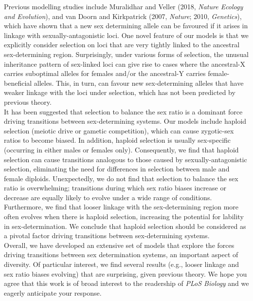 \documentclass[12pt,letterpaper]{article}
\begin{document}
Previous modelling studies include Muralidhar and Veller (2018, \textit{Nature Ecology and Evolution}), and van Doorn and Kirkpatrick (2007, \textit{Nature}; 2010, \textit{Genetics}), which have shown that a new sex determining allele can be favoured if it arises in linkage with sexually-antagonistic loci. 
One novel feature of our models is that we explicitly consider selection on loci that are very tightly linked to the ancestral sex-determining region.
Surprisingly, under various forms of selection, the unusual inheritance pattern of sex-linked loci can give rise to cases where the ancestral-X carries suboptimal alleles for females and/or the ancestral-Y carries female-beneficial alleles. 
This, in turn, can favour new sex-determining alleles that have weaker linkage with the loci under selection, which has not been predicted by previous theory. \\

It has been suggested that selection to balance the sex ratio is a dominant force driving transitions between sex-determining systems. 
Our models include haploid selection (meiotic drive or gametic competition), which can cause zygotic-sex ratios to become biased. 
In addition, haploid selection is usually sex-specific (occurring in either males or females only). 
Consequently, we find that haploid selection can cause transitions analogous to those caused by sexually-antagonistic selection, eliminating the need for differences in selection between male and female diploids. 
Unexpectedly, we do not find that selection to balance the sex ratio is overwhelming; transitions during which sex ratio biases increase or decrease are equally likely to evolve under a wide range of conditions. 
Furthermore, we find that looser linkage with the sex-determining region more often evolves when there is haploid selection, increasing the potential for lability in sex-determination. 
We conclude that haploid selection should be considered as a pivotal factor driving transitions between sex-determining systems. \\

Overall, we have developed an extensive set of models that explore the forces driving transitions between sex determination systems, an important aspect of diversity. 
Of particular interest, we find several results (e.g., looser linkage and sex ratio biases evolving) that are surprising, given previous theory. 
We hope you agree that this work is of broad interest to the readership of \textit{PLoS Biology} and we eagerly anticipate your response. \\
\end{document}

